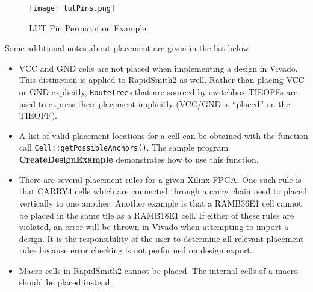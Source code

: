 \begin{figure}[]
	\centering
	\texttt{[image: lutPins.png]}
	\caption{LUT Pin Permutation Example}
	\label{fig:lutPins}
  \end{figure}
  
\vspace{.2cm}
\noindent
Some additional notes about placement are given in the list below: 

\begin {itemize}
  \item VCC and GND cells are not placed when implementing a design in Vivado.
  This distinction is applied to RapidSmith2 as well. Rather than placing VCC
  or GND explicitly, \texttt{RouteTree}s that are sourced by switchbox TIEOFFs
  are used to express their placement implicitly (VCC/GND is ``placed'' on the
  TIEOFF).
  
  \item A list of valid placement locations for a cell can be obtained with the
  function call \texttt{Cell::get\-Possible\-Anchors()}. The sample program
  \textbf{CreateDesignExample} demonstrates how to use this function.
 
  \item There are several placement rules for a given Xilinx FPGA. One such
  rule is that CARRY4 cells which are connected through a carry chain need
  to placed vertically to one another. Another example is that a RAMB36E1
  cell cannot be placed in the same tile as a RAMB18E1 cell. If either of these
  rules are violated, an error will be thrown in Vivado when attempting to
  import a design. It is the responsibility of the user to determine all
  relevant placement rules because error checking is not performed on design
  export.
  
  \item Macro cells in RapidSmith2 cannot be placed. The internal cells of a
  macro should be placed instead.
\end{itemize}
